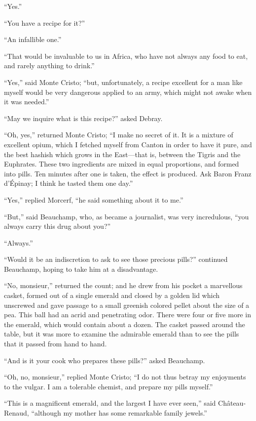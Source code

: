 “Yes.”

“You have a recipe for it?”

“An infallible one.”

“That would be invaluable to us in Africa, who have not always any food
to eat, and rarely anything to drink.”

“Yes,” said Monte Cristo; “but, unfortunately, a recipe excellent for a
man like myself would be very dangerous applied to an army, which might
not awake when it was needed.”

“May we inquire what is this recipe?” asked Debray.

“Oh, yes,” returned Monte Cristo; “I make no secret of it. It is a
mixture of excellent opium, which I fetched myself from Canton in order
to have it pure, and the best hashish which grows in the East—that is,
between the Tigris and the Euphrates. These two ingredients are mixed
in equal proportions, and formed into pills. Ten minutes after one is
taken, the effect is produced. Ask Baron Franz d’Épinay; I think he
tasted them one day.”

“Yes,” replied Morcerf, “he said something about it to me.”

“But,” said Beauchamp, who, as became a journalist, was very
incredulous, “you always carry this drug about you?”

“Always.”

“Would it be an indiscretion to ask to see those precious pills?”
continued Beauchamp, hoping to take him at a disadvantage.

“No, monsieur,” returned the count; and he drew from his pocket a
marvellous casket, formed out of a single emerald and closed by a
golden lid which unscrewed and gave passage to a small greenish colored
pellet about the size of a pea. This ball had an acrid and penetrating
odor. There were four or five more in the emerald, which would contain
about a dozen. The casket passed around the table, but it was more to
examine the admirable emerald than to see the pills that it passed from
hand to hand.

“And is it your cook who prepares these pills?” asked Beauchamp.

“Oh, no, monsieur,” replied Monte Cristo; “I do not thus betray my
enjoyments to the vulgar. I am a tolerable chemist, and prepare my
pills myself.”

“This is a magnificent emerald, and the largest I have ever seen,” said
Château-Renaud, “although my mother has some remarkable family jewels.”

